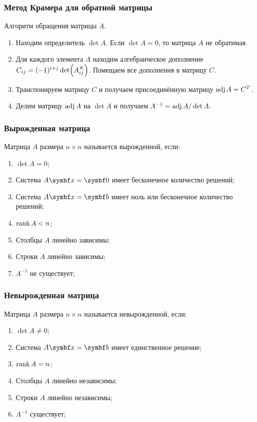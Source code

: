 \begin{frame}
        \frametitle{Метод Крамера для обратной матрицы}
    
        Алгоритм обращения матрицы $A$.

        \begin{enumerate}
            \item Находим определитель $\det A$. Если $\det A = 0$, то матрица $A$ не обратимая. \pause
            \item Для каждого элемента $A$ находим алгебраическое дополнение $C_{ij} = (-1)^{i+j}\det (A_{ij}^{\cross})$.
            Помещаем все дополнения в матрицу $C$. \pause
            \item Транспонируем матрицу $C$ и получаем \alert{присоединённую матрицу} $\operatorname{adj} A = C^T$.  \pause
            \item Делим матрицу $\operatorname{adj} A$ на $\det A$ и получаем $A^{-1} = \operatorname{adj} A/\det A$.
        \end{enumerate}
        
    
\end{frame}


\begin{frame}
    \frametitle{Вырожденная матрица}

    Матрица $A$ размера $n\times n$ называется \alert{вырожденной}, если:

    \begin{enumerate}
        \item $\det A = 0$; \pause
        \item Система $A \bx = \bzero$ имеет бесконечное количество решений; \pause
        \item Система $A \bx = \bb$ имеет ноль или бесконечное количество решений; \pause
        \item $\rank A < n$; \pause
        \item Столбцы $A$ линейно зависимы; \pause
        \item Строки $A$ линейно зависимы; \pause
        \item $A^{-1}$ не существует; \pause
    \end{enumerate}
\end{frame}

\begin{frame}
\frametitle{Невырожденная матрица}
    

Матрица $A$ размера $n\times n$ называется \alert{невырожденной}, если:

\begin{enumerate}
    \item $\det A \neq 0$; \pause
    \item Система $A \bx = \bb$ имеет единственное решение; \pause
    \item $\rank A = n$; \pause
    \item Столбцы $A$ линейно независимы; \pause
    \item Строки $A$ линейно независимы; \pause
    \item $A^{-1}$ существует;
\end{enumerate}


\end{frame}